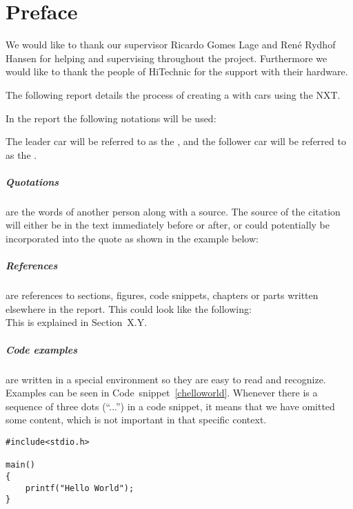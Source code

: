 \chapter*{Preface}
\label{preface}

We would like to thank our supervisor Ricardo Gomes Lage and Ren\'e Rydhof Hansen for helping and supervising throughout the project.
Furthermore we would like to thank the people of HiTechnic for the support with their hardware.

The following report details the process of creating a \roadtrain{} with \lego{} cars using the \lego{} NXT.

In the report the following notations will be used:

The leader car will be referred to as the \runner{}, and the follower car will be referred to as the \stalker{}.

\paragraph{Quotations} are the words of another person along with a source.
The source of the citation will either be in the text immediately before or after, or could potentially be incorporated into the quote as shown in the example below: \\


\paragraph{References} are references to sections, figures, code snippets, chapters or parts written elsewhere in the report. 
This could look like the following:\\

This is explained in Section~X.Y.

\paragraph{Code examples} are written in a special environment so they are easy to read and recognize. 
Examples can be seen in Code~snippet~\ref{chelloworld}. 
Whenever there is a sequence of three dots (``...'') in a code snippet, it means that we have omitted some content, which is not important in that specific context.

\begin{lstlisting}[style=sourceC, caption={Code example of a hello world program written in C.}, label=chelloworld]
#include<stdio.h>

main()
{
    printf("Hello World");
}
\end{lstlisting}